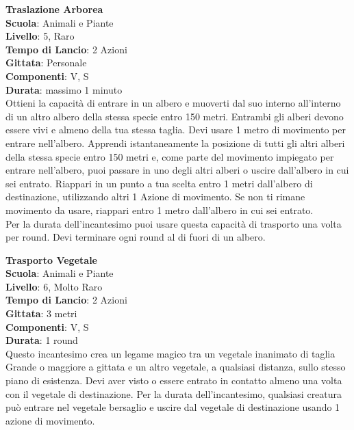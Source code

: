\begin{multicols}{2}
\medskip\textbf{Traslazione Arborea}\\
\textbf{Scuola}: Animali e Piante\\
\textbf{Livello}: 5, Raro\\
\textbf{Tempo di Lancio}: 2 Azioni\\
\textbf{Gittata}: Personale\\
\textbf{Componenti}: V, S\\
\textbf{Durata}: massimo 1 minuto\\
Ottieni la capacità di entrare in un albero e muoverti dal suo interno all'interno di un altro albero della stessa specie entro 150 metri. Entrambi gli alberi devono essere vivi e almeno della tua stessa taglia. Devi usare 1 metro di movimento per entrare nell'albero. Apprendi istantaneamente la posizione di tutti gli altri alberi della stessa specie entro 150 metri e, come parte del movimento impiegato per entrare nell'albero, puoi passare in uno degli altri alberi o uscire dall'albero in cui sei entrato. Riappari in un punto a tua scelta entro 1 metri dall'albero di destinazione, utilizzando altri 1 Azione di movimento. Se non ti rimane movimento da usare, riappari entro 1 metro dall'albero in cui sei entrato.\\
Per la durata dell'incantesimo puoi usare questa capacità di trasporto una volta per round. Devi terminare ogni round al di fuori di un albero.

\medskip\textbf{Trasporto Vegetale}\\
\textbf{Scuola}: Animali e Piante\\
\textbf{Livello}: 6, Molto Raro\\
\textbf{Tempo di Lancio}: 2 Azioni\\
\textbf{Gittata}: 3 metri\\
\textbf{Componenti}: V, S\\
\textbf{Durata}: 1 round\\
Questo incantesimo crea un legame magico tra un vegetale inanimato di taglia Grande o maggiore a gittata e un altro vegetale, a qualsiasi distanza, sullo stesso piano di esistenza. Devi aver visto o essere entrato in contatto almeno una volta con il vegetale di destinazione. Per la durata dell'incantesimo, qualsiasi creatura può entrare nel vegetale bersaglio e uscire dal vegetale di destinazione usando 1 azione di movimento.


\end{multicols}
